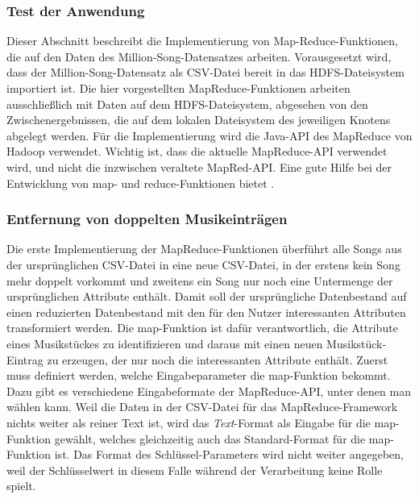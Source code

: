 \subsubsection{Test der Anwendung}

Dieser Abschnitt beschreibt die Implementierung von Map-Reduce-Funktionen, die auf den Daten
des Million-Song-Datensatzes arbeiten. Vorausgesetzt wird, dass der Million-Song-Datensatz als
CSV-Datei bereit in das HDFS-Dateisystem importiert ist. Die hier vorgestellten MapReduce-Funktionen
arbeiten ausschließlich mit Daten auf dem HDFS-Dateisystem, abgesehen von den Zwischenergebnissen,
die auf dem lokalen Dateisystem des jeweiligen Knotens abgelegt werden.
Für die Implementierung wird die Java-API des MapReduce von Hadoop verwendet. Wichtig ist,
dass die aktuelle MapReduce-API verwendet wird, und nicht die inzwischen veraltete MapRed-API.
Eine gute Hilfe bei der Entwicklung von map- und reduce-Funktionen bietet \cite{miner2012mapreduce}.

\subsubsection{Entfernung von doppelten Musikeinträgen}

Die erste Implementierung der MapReduce-Funktionen überführt alle Songs aus der ursprünglichen
CSV-Datei in eine neue CSV-Datei, in der erstens kein Song mehr doppelt vorkommt und zweitens
ein Song nur noch eine Untermenge der ursprünglichen Attribute enthält. Damit soll der ursprüngliche
Datenbestand auf einen reduzierten Datenbestand mit den für den Nutzer interessanten Attributen 
transformiert werden. Die map-Funktion ist dafür verantwortlich, die Attribute eines Musikstückes
zu identifizieren und daraus mit einen neuen Musikstück-Eintrag zu erzeugen, der nur noch die interessanten
Attribute enthält.
Zuerst muss definiert werden, welche Eingabeparameter die map-Funktion bekommt. Dazu gibt es verschiedene
Eingabeformate der MapReduce-API, unter denen man wählen kann. Weil die Daten in der CSV-Datei für das
MapReduce-Framework nichts weiter als reiner Text ist, wird das \textit{Text}-Format als Eingabe für
die map-Funktion gewählt, welches gleichzeitig auch das Standard-Format für die map-Funktion ist.
Das Format des Schlüssel-Parameters wird nicht weiter angegeben, weil der Schlüsselwert in diesem Falle 
während der Verarbeitung keine Rolle spielt.

